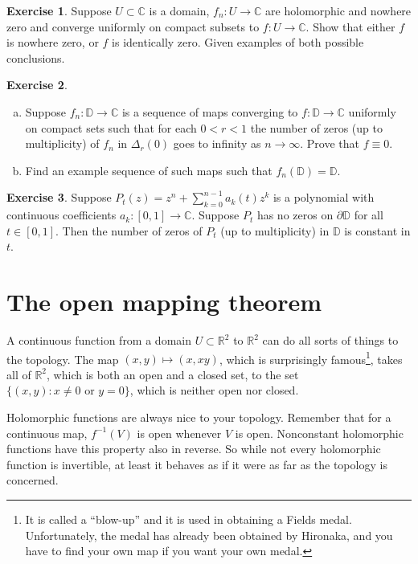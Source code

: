 \documentclass[12pt,openany]{book}
\newcommand{\C}{{\mathbb{C}}}
\newcommand{\R}{{\mathbb{R}}}
\newcommand{\D}{{\mathbb{D}}}
\theoremstyle{plain}
\theoremstyle{remark}
\theoremstyle{definition}
\newenvironment{exbox}{%
    \def\FrameCommand{\vrule width 1pt \relax\hspace{10pt}}%
    \MakeFramed{\advance\hsize-\width\FrameRestore}%
}{%
    \endMakeFramed
}
\newenvironment{exparts}{%
    \leavevmode\begin{enumerate}[a),noitemsep,topsep=0pt,parsep=0pt,partopsep=0pt]
}{%
    \end{enumerate}
}
\theoremstyle{exercise}
\newtheorem{exercise}{Exercise}[section]
\theoremstyle{example}
\begin{document}
\begin{exbox}
\begin{exercise}
Suppose $U \subset \C$ is a domain,
$f_n \colon U \to \C$ are holomorphic and nowhere zero
and converge uniformly on compact subsets to $f \colon U \to \C$.
Show that either $f$ is nowhere zero, or $f$ is identically zero.
Given examples of both possible conclusions.
\end{exercise}

\begin{exercise}
\begin{exparts}
\item
Suppose $f_n \colon \D \to \C$ is a sequence of maps converging
to $f \colon \D \to \C$ uniformly on compact sets such that
for each $0 < r < 1$ the number of zeros (up to multiplicity)
of $f_n$ in $\Delta_r(0)$ goes to infinity as $n \to \infty$.
Prove that $f \equiv 0$.
\item
Find an example sequence of such maps such that $f_n(\D) = \D$.
\end{exparts}
\end{exercise}

\begin{exercise}
Suppose $P_t(z) = z^n + \sum_{k=0}^{n-1} a_k(t) z^k$ is a polynomial
with continuous coefficients $a_k \colon [0,1] \to \C$.  Suppose $P_t$ has
no zeros on $\partial \D$ for all $t \in [0,1]$.  Then the number of zeros
of $P_t$ (up to multiplicity) in $\D$ is constant in $t$.
\end{exercise}
\end{exbox}


\section{The open mapping theorem}

A continuous function from a domain $U \subset \R^2$ to $\R^2$ can do all
sorts of things to the topology.  The map $(x,y) \mapsto (x,xy)$, which
is surprisingly famous\footnote{%
It is called a ``blow-up'' and it is used in obtaining a Fields medal.
Unfortunately, the medal has already been obtained by Hironaka, and you
have to find your own map if you want your own medal.},
takes all of $\R^2$, which is both an open and a closed set, to the
set $\{ (x,y) : x \not= 0 \text{ or } y=0 \}$, which is neither open nor
closed.

Holomorphic functions are always nice to your topology.
Remember that for a continuous map, $f^{-1}(V)$ is open whenever
$V$ is open.  Nonconstant holomorphic functions have this property also in
reverse.  So while not every holomorphic function is invertible, at least it
behaves as if it were as far as the topology is concerned.
\end{document}
